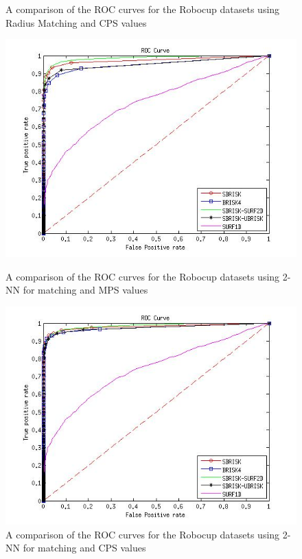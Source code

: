 \documentclass{report}
\begin{document}
\begin{figure}[h!]
\begin{minipage}[b]{0.5\linewidth}
\caption{A comparison of the ROC curves for the Robocup datasets using Radius Matching and CPS values}
\label{fig:compareHammingConsistent}
\end{minipage}
\begin{minipage}[b]{0.5\linewidth}
\includegraphics[scale=0.4]{../Drawings/RobocupDataset/ROC_General_KNN_max.jpg}
\caption{A comparison of the ROC curves for the Robocup datasets using 2-NN for matching and MPS values}
\label{fig:compareKNN}
\end{minipage}
\begin{minipage}[b]{0.5\linewidth}
\includegraphics[scale=0.4]{../Drawings/RobocupDataset/ROC_General_KNN_consistent.jpg}
\caption{A comparison of the ROC curves for the Robocup datasets using 2-NN for matching and CPS values}
\label{fig:compareKNNConsistent}
\end{minipage}
\end{figure}
\end{document}
